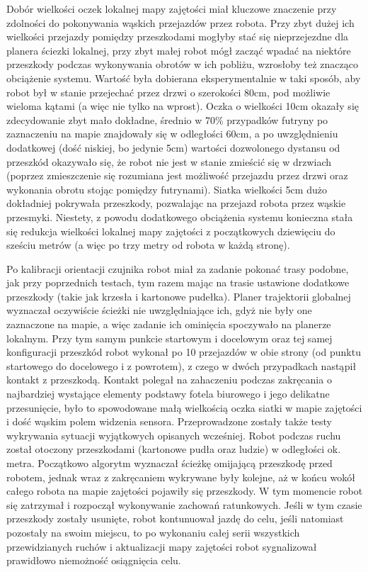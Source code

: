 Dobór wielkości oczek lokalnej mapy zajętości miał kluczowe znaczenie przy zdolności
do pokonywania wąskich przejazdów przez robota. Przy zbyt dużej ich wielkości
przejazdy pomiędzy przeszkodami mogłyby stać się nieprzejezdne dla planera 
ściezki lokalnej, przy zbyt małej robot mógł zacząć wpadać na niektóre przeszkody
podczas wykonywania obrotów w ich pobliżu, wzrosłoby też znacząco obciążenie
systemu. Wartość była dobierana eksperymentalnie w taki sposób, aby robot był
w stanie przejechać przez drzwi o szerokości 80cm, pod możliwie wieloma kątami
(a więc nie tylko na wprost). Oczka o wielkości 10cm okazały się zdecydowanie 
zbyt mało dokładne, średnio w 70\% przypadków futryny po zaznaczeniu na mapie 
znajdowały się w odległości 60cm, a po uwzględnieniu dodatkowej (dość niskiej, 
bo jedynie 5cm) wartości dozwolonego dystansu od przeszkód okazywało się, że
robot nie jest w stanie zmieścić się w drzwiach (poprzez zmieszczenie się
rozumiana jest możliwość przejazdu przez drzwi oraz wykonania obrotu stojąc 
pomiędzy futrynami). Siatka wielkości 5cm dużo dokładniej pokrywała przeszkody,
pozwalając na przejazd robota przez wąskie przesmyki. Niestety, z powodu dodatkowego 
obciążenia systemu konieczna stała się redukcja wielkości lokalnej mapy zajętości
z początkowych dziewięciu do sześciu metrów (a więc po trzy metry od robota 
w każdą stronę). 

Po kalibracji orientacji czujnika robot miał za zadanie pokonać trasy podobne,
jak przy poprzednich testach, tym razem mając na trasie ustawione dodatkowe
przeszkody (takie jak krzesła i kartonowe pudełka). Planer trajektorii 
globalnej wyznaczał oczywiście ścieżki nie uwzględniające ich, gdyż nie 
były one zaznaczone na mapie, a więc zadanie ich ominięcia spoczywało na
planerze lokalnym. Przy tym samym punkcie startowym i docelowym oraz tej 
samej konfiguracji przeszkód robot wykonał po 10 przejazdów w obie strony 
(od punktu startowego do docelowego i z powrotem), z czego w dwóch przypadkach 
nastąpił kontakt z przeszkodą. Kontakt polegał na zahaczeniu podczas zakręcania
o najbardziej wystające elementy podstawy fotela biurowego i jego delikatne 
przesunięcie, było to spowodowane małą wielkością oczka siatki w mapie zajętości
i dość wąskim polem widzenia sensora. Przeprowadzone zostały także testy 
wykrywania sytuacji wyjątkowych opisanych wcześniej. Robot podczas ruchu 
został otoczony przeszkodami (kartonowe pudła oraz ludzie) w odległości 
ok. metra. Początkowo algorytm wyznaczał ścieżkę omijającą przeszkodę przed 
robotem, jednak wraz z zakręcaniem wykrywane były kolejne, aż w końcu wokół
całego robota na mapie zajętości pojawiły się przeszkody. W tym momencie 
robot się zatrzymał i rozpoczął wykonywanie zachowań ratunkowych. Jeśli 
w tym czasie przeszkody zostały usunięte, robot kontunuował jazdę do celu,
jeśli natomiast pozostały na swoim miejscu, to po wykonaniu całej serii 
wszystkich przewidzianych ruchów i aktualizacji mapy zajętości robot sygnalizował
prawidłowo niemożność osiągnięcia celu. 

